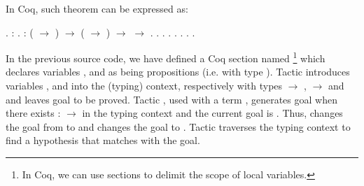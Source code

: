 In Coq, such theorem can be expressed as:
 \begin{coqdoccode}
\coqdocemptyline
\coqdocnoindent
{} .\coqdoceol
\coqdocindent{1.50em}
    : .\coqdoceol
\coqdocindent{1.50em}
  : ( \ensuremath{\rightarrow} ) \ensuremath{\rightarrow} ( \ensuremath{\rightarrow} ) \ensuremath{\rightarrow}  \ensuremath{\rightarrow} .\coqdoceol
\coqdocindent{1.50em}
.\coqdoceol
\coqdocindent{3.50em}
   .  .  . .\coqdoceol
\coqdocindent{1.50em}
.\coqdoceol
\coqdocnoindent
{} .\coqdoceol
\coqdocemptyline
\end{coqdoccode}
In the previous source code, we have defined a Coq section named
\footnote{In Coq, we can use sections to delimit the
  scope of local variables.} which declares variables ,
 and  as being propositions (i.e. with type
). Tactic  introduces variables
,  and  into the (typing) context,
respectively with types  \ensuremath{\rightarrow} ,  \ensuremath{\rightarrow}  and
 and leaves goal  to be proved. Tactic
, used with a term , generates goal 
when there exists :  \ensuremath{\rightarrow}  in the typing context and the
current goal is . Thus,   changes the goal
from  to  and   changes the goal to
. Tactic  traverses the typing context to
find a hypothesis that matches with the goal.


